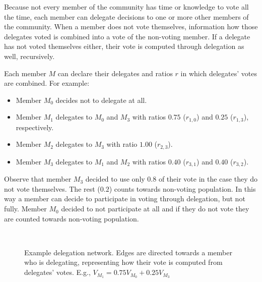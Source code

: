 \documentclass{sigchi}
\begin{document}
Because not every member of the community has time or knowledge to vote all the time, each member can delegate
decisions to one or more other members of the community.
When a member does not vote themselves, information how those delegates voted is combined into a vote of
the non-voting member.
If a delegate has not voted themselves either, their vote is computed through delegation as well, recursively.

Each member $M$ can declare their delegates and ratios $r$ in which delegates' votes are combined. For example:

\begin{itemize}
\item Member $M_0$ decides not to delegate at all.
\item Member $M_1$ delegates to $M_0$ and $M_3$ with ratios $0.75$ ($r_{1,0}$) and $0.25$ ($r_{1,3}$), respectively.
\item Member $M_2$ delegates to $M_3$ with ratio $1.00$ ($r_{2,3}$).
\item Member $M_3$ delegates to $M_1$ and $M_2$ with ratios $0.40$ ($r_{3,1}$) and $0.40$ ($r_{3,2}$).
\end{itemize}

Observe that member $M_3$ decided to use only $0.8$ of their vote in the case they do not vote themselves.
The rest ($0.2$) counts towards non-voting population.
In this way a member can decide to participate in voting through delegation, but not fully.
Member $M_0$ decided to not participate at all and if they do not vote they are counted towards non-voting population.

\begin{figure}
  \centering
  \caption{Example delegation network. Edges are directed towards a member who is delegating, representing how their
  vote is computed from delegates' votes. E.g., $V_{M_1} = 0.75 V_{M_0} + 0.25 V_{M_3}$}~\label{fig:delegation-network}
\end{figure}
\end{document}
